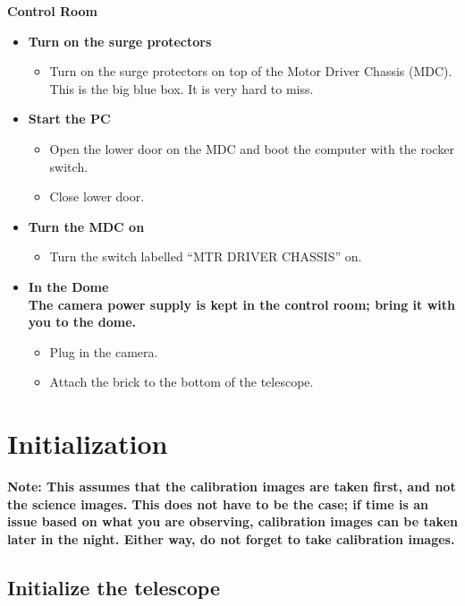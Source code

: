 \documentclass[letterpaper, 12pt]{report}
\begin{document}
{\large\textbf{Control Room}}
\begin{itemize}
	\item \textbf{Turn on the surge protectors}
	\begin{itemize}
		\item Turn on the surge protectors on top of the Motor Driver Chassis (MDC). This is the big blue box. It is very hard to miss.
	\end{itemize}
	\item \textbf{Start the PC}
	\begin{itemize}
		\item Open the lower door on the MDC and boot the computer with the rocker switch.
		\item Close lower door.
	\end{itemize}
	\item \textbf{Turn the MDC on}
	\begin{itemize}
		\item Turn the switch labelled ``MTR DRIVER CHASSIS'' on.
	\end{itemize}
	\item \textbf{In the Dome} \\
	\noindent \textbf{The camera power supply is kept in the control room; bring it with you to the dome.}
	\begin{itemize}
		\item Plug in the camera.
		\item Attach the brick to the bottom of the telescope.
	\end{itemize}
\end{itemize}

\newpage



\chapter{Initialization}\label{ch:initialization}
\textbf{Note: This assumes that the calibration images are taken first, and not the science images. This does not have to be the case; if time is an issue based on what you are observing, calibration images can be taken later in the night. Either way, do not forget to take calibration images.} \\

\section{Initialize the telescope}
\end{document}
